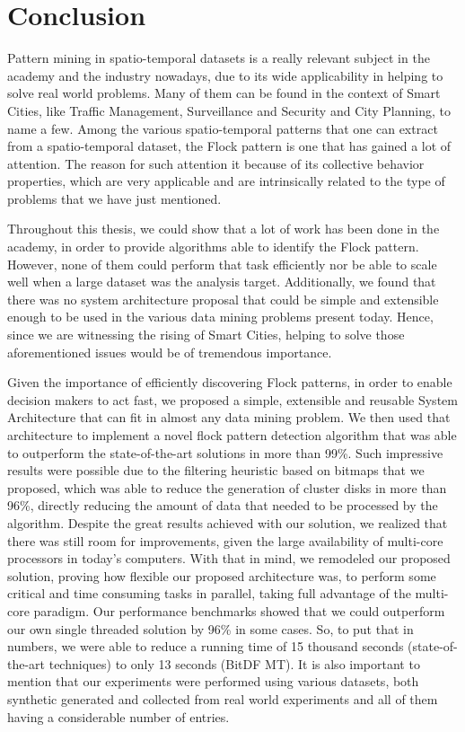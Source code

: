 \chapter{Conclusion}
\label{chp:conclusion}
Pattern mining in spatio-temporal datasets is a really relevant subject in the academy and the industry nowadays, due
to its wide applicability in helping to solve real world problems. Many of them can be found in the context of Smart
Cities, like Traffic Management, Surveillance and Security and City Planning, to name a few. Among the various
spatio-temporal patterns that one can extract from a spatio-temporal dataset, the Flock pattern is one that has gained a
lot of attention. The reason for such attention it because of its collective behavior properties, which are very
applicable and are intrinsically related to the type of problems that we have just mentioned.

Throughout this thesis, we could show that a lot of work has been done in the academy, in order to provide algorithms
able to identify the Flock pattern. However, none of them could perform that task efficiently nor be able to scale well
when a large dataset was the analysis target. Additionally, we found that there was no system architecture proposal that
could be simple and extensible enough to be used in the various data mining problems present today. Hence, since we are
witnessing the rising of Smart Cities, helping to solve those aforementioned issues would be of tremendous importance.

Given the importance of efficiently discovering Flock patterns, in order to enable decision makers to act fast, we
proposed a simple, extensible and reusable System Architecture that can fit in almost any data mining problem. We then
used that architecture to implement a novel flock pattern detection algorithm that was able to outperform the
state-of-the-art solutions in more than 99\%. Such impressive results were possible due to the filtering heuristic based
on bitmaps that we proposed, which was able to reduce the generation of cluster disks in more than 96\%, directly
reducing the amount of data that needed to be processed by the algorithm. Despite the great results achieved with our
solution, we realized that there was still room for improvements, given the large availability of multi-core processors
in today's computers. With that in mind, we remodeled our proposed solution, proving how flexible our proposed
architecture was, to perform some critical and time consuming tasks in parallel, taking full advantage of the multi-core
paradigm. Our performance benchmarks showed that we could outperform our own single threaded solution by 96\% in some
cases. So, to put that in numbers, we were able to reduce a running time of 15 thousand seconds (state-of-the-art
techniques) to only 13 seconds (BitDF MT). It is also important to mention that our experiments were performed using
various datasets, both synthetic generated and collected from real world experiments and all of them having a
considerable number of entries.


